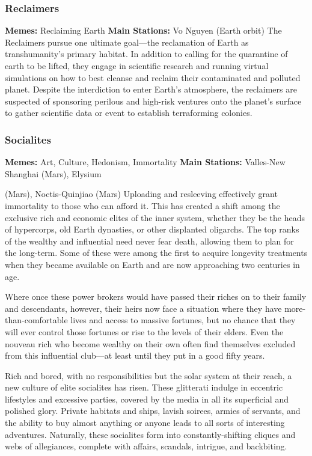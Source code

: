 \subsubsection{Reclaimers}

\textbf{Memes:} Reclaiming Earth
\textbf{Main Stations:} Vo Nguyen (Earth orbit)
The Reclaimers pursue one ultimate goal—the reclamation
of Earth as transhumanity's primary habitat.
In addition to calling for the quarantine of earth to be 
lifted, they engage in scientific research and running 
virtual simulations on how to best cleanse and reclaim 
their contaminated and polluted planet. Despite the 
interdiction to enter Earth's atmosphere, the reclaimers
are suspected of sponsoring perilous and high-risk
ventures onto the planet's surface to gather scientific 
data or event to establish terraforming colonies.

\subsubsection{Socialites}

\textbf{Memes:} Art, Culture, Hedonism, Immortality
\textbf{Main Stations:} Valles-New Shanghai (Mars), Elysium 

(Mars), Noctis-Quinjiao (Mars)
Uploading and resleeving effectively grant immortality 
to those who can afford it. This has created a shift 
among the exclusive rich and economic elites of the 
inner system, whether they be the heads of hypercorps, 
old Earth dynasties, or other displanted oligarchs. The 
top ranks of the wealthy and influential need never 
fear death, allowing them to plan for the long-term. 
Some of these were among the first to acquire longevity
treatments when they became available on Earth
and are now approaching two centuries in age.

Where once these power brokers would have 
passed their riches on to their family and descendants, 
however, their heirs now face a situation where they 
have more-than-comfortable lives and access to massive
fortunes, but no chance that they will ever control
those fortunes or rise to the levels of their elders. Even 
the nouveau rich who become wealthy on their own 
often find themselves excluded from this influential 
club—at least until they put in a good fifty years.

Rich and bored, with no responsibilities but the 
solar system at their reach, a new culture of elite socialites
has risen. These glitterati indulge in eccentric
lifestyles and excessive parties, covered by the media 
in all its superficial and polished glory. Private habitats 
and ships, lavish soirees, armies of servants, and the 
ability to buy almost anything or anyone leads to all 
sorts of interesting adventures. Naturally, these socialites
form into constantly-shifting cliques and webs of
allegiances, complete with affairs, scandals, intrigue, 
and backbiting.

